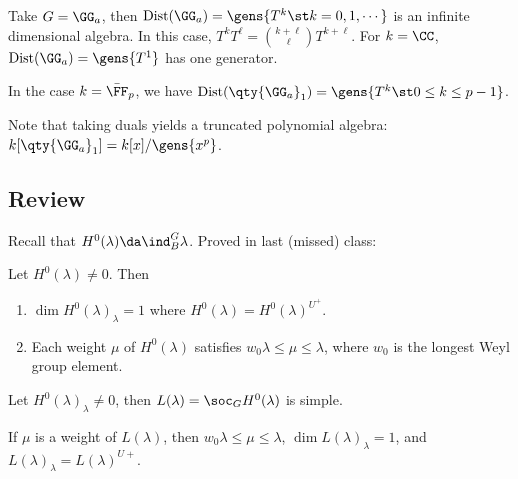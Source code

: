 \begin{example}

Take \(G = \GG_a\), then
\(\mathrm{Dist}(\GG_a) = \gens{T^k \st k=0,1,\cdots}\) is an infinite
dimensional algebra. In this case,
\(T^k T^\ell = {k+\ell \choose \ell}T^{k+\ell}\). For \(k=\CC\),
\(\mathrm{Dist}(\GG_a) = \gens{T^1}\) has one generator.

In the case \(k = \bar \FF_p\), we have
\(\mathrm{Dist}(\qty{\GG_a}_1) = \gens{T^k \st 0\leq k \leq p-1}\).

Note that taking duals yields a truncated polynomial algebra:
\(k[\qty{\GG_a}_1] = k[x] / \gens{x^p}\).

\end{example}

\hypertarget{review-1}{%
\subsection{Review}\label{review-1}}

Recall that \(H^0(\lambda) \da \ind_B^G \lambda\). Proved in last
(missed) class:

\begin{remark}

Let \(H^0(\lambda) \neq 0\). Then

\begin{enumerate}
\def\labelenumi{\alph{enumi}.}
\item
  \(\dim H^0(\lambda)_\lambda = 1\) where
  \(H^0(\lambda) = H^0(\lambda)^{U^+}\).
\item
  Each weight \(\mu\) of \(H^0(\lambda)\) satisfies
  \(w_0 \lambda \leq \mu \leq \lambda\), where \(w_0\) is the longest
  Weyl group element.
\end{enumerate}

\end{remark}

\begin{remark}

Let \(H^0(\lambda)_\lambda \neq 0\), then
\(L(\lambda) = \soc_G H^0(\lambda)\) is simple.

\end{remark}

\begin{remark}

If \(\mu\) is a weight of \(L(\lambda)\), then
\(w_0 \lambda \leq \mu \leq \lambda\), \(\dim L(\lambda)_\lambda = 1\),
and \(L(\lambda)_\lambda = L(\lambda)^{U+}\).

\end{remark}

